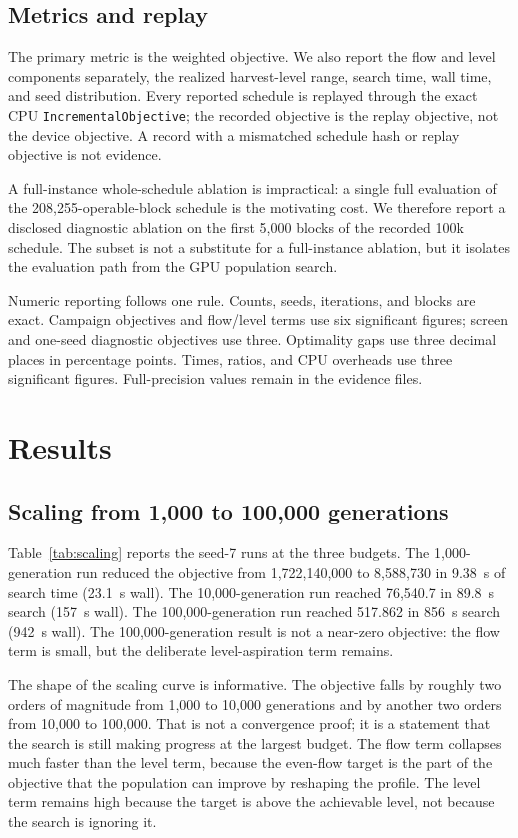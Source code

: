 \documentclass[preprint,11pt]{elsarticle}
\begin{document}
\subsection{Metrics and replay}

The primary metric is the weighted objective. We also report the flow and
level components separately, the realized harvest-level range, search time, wall
time, and seed distribution. Every reported schedule is replayed through the
exact CPU \texttt{IncrementalObjective}; the recorded objective is the replay
objective, not the device objective. A record with a mismatched schedule hash or
replay objective is not evidence.

A full-instance whole-schedule ablation is impractical: a single full evaluation
of the 208,255-operable-block schedule is the motivating cost. We therefore
report a disclosed diagnostic ablation on the first 5,000 blocks of the recorded
100k schedule. The subset is not a substitute for a full-instance ablation, but
it isolates the evaluation path from the GPU population search.

Numeric reporting follows one rule. Counts, seeds, iterations, and blocks are exact. Campaign
objectives and flow/level terms use six significant figures; screen and one-seed diagnostic
objectives use three. Optimality gaps use three decimal places in percentage points. Times, ratios,
and CPU overheads use three significant figures. Full-precision values remain in the evidence files.

\section{Results}\label{results}

\subsection{Scaling from 1,000 to 100,000 generations}

Table~\ref{tab:scaling} reports the seed-7 runs at the three budgets. The
1,000-generation run reduced the objective from 1,722,140,000 to
8,588,730 in 9.38~s of search time (23.1~s wall). The
10,000-generation run reached 76,540.7 in 89.8~s search (157~s wall).
The 100,000-generation run reached 517.862 in 856~s search
(942~s wall). The 100,000-generation result is not a near-zero objective: the
flow term is small, but the deliberate level-aspiration term remains.

The shape of the scaling curve is informative. The objective falls by roughly two orders of magnitude
from 1,000 to 10,000 generations and by another two orders from 10,000 to 100,000. That is not a
convergence proof; it is a statement that the search is still making progress at the largest budget.
The flow term collapses much faster than the level term, because the even-flow target is the part of
the objective that the population can improve by reshaping the profile. The level term remains high
because the target is above the achievable level, not because the search is ignoring it.
\end{document}
